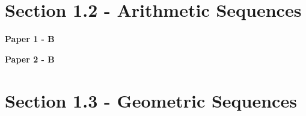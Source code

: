\documentclass[12pt, a4paper]{article}
\begin{document}
\section*{Section 1.2 - Arithmetic Sequences \NF}\label{section:6-1-2}

\textbf{Paper 1 - B}
\begin{enumx}[label=\arabic*.,start=1]
\item {}\label{DSE2014-CoreP1-Q16} 
\end{enumx}
\textbf{Paper 2 - B}
\begin{enumx}[label=\arabic*.,start=2]
\item {}\label{DSE2012S-CoreP2-Q36} 
\item {}\label{DSE2012-CoreP2-Q37} 
\item {}\label{DSE2017-CoreP2-Q36} 
\item {}\label{DSE2018-CoreP2-Q45} 
\item {}\label{DSE2020-CoreP2-Q35} 
\end{enumx}




\section*{Section 1.3 - Geometric Sequences \NF}\label{section:6-1-3}
\end{document}
